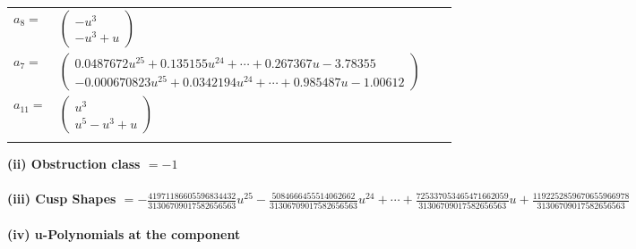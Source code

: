 \documentclass[1p]{elsarticle_modified}
\theoremstyle{definition}
\begin{document}
\begin{tabular}{m{7pt} m{180pt} m{7pt} m{180pt} }
\flushright $a_{8}=$&$\begin{pmatrix}- u^3\\- u^3+u\end{pmatrix}$ \\
\flushright $a_{7}=$&$\begin{pmatrix}0.0487672 u^{25}+0.135155 u^{24}+\cdots+0.267367 u-3.78355\\-0.000670823 u^{25}+0.0342194 u^{24}+\cdots+0.985487 u-1.00612\end{pmatrix}$ \\
\flushright $a_{11}=$&$\begin{pmatrix}u^3\\u^5- u^3+u\end{pmatrix}$\\&\end{tabular}
\flushleft \textbf{(ii) Obstruction class $= -1$}\\~\\
\flushleft \textbf{(iii) Cusp Shapes $= -\frac{41971186605596834432}{31306709017582656563} u^{25}-\frac{5084666455514062662}{31306709017582656563} u^{24}+\cdots+\frac{725337053465471662059}{31306709017582656563} u+\frac{1192252859670655966978}{31306709017582656563}$}\\~\\
\newpage\renewcommand{\arraystretch}{1}
\flushleft \textbf{(iv) u-Polynomials at the component}\newline \\
\end{document}
